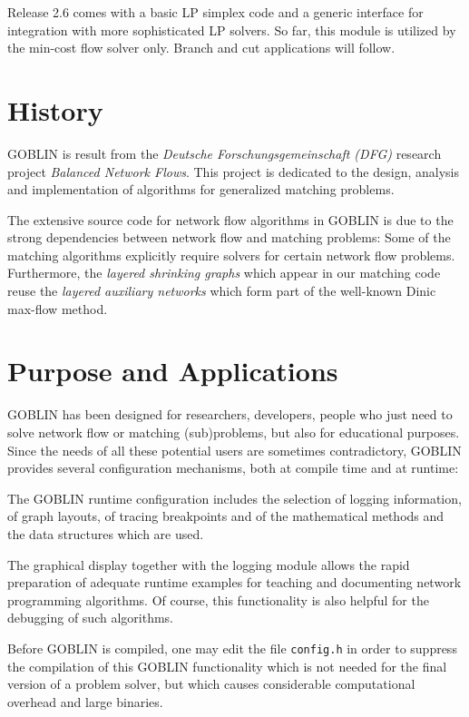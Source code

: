 \documentclass[a4paper,11pt,twoside]{book}
\begin{document}
\begin{multicols}{2}
Release 2.6 comes with a basic LP simplex code and a generic interface for
integration with more sophisticated LP solvers. So far, this module is
utilized by the min-cost flow solver only. Branch and cut applications will
follow.




\section{History}
GOBLIN is result from the {\it Deutsche Forschungsgemeinschaft (DFG)} research
project {\it Balanced Network Flows}. This project is dedicated to the design,
analysis and implementation of algorithms for generalized matching problems. 

The extensive source code for network flow algorithms in GOBLIN is due to the
strong dependencies between network flow and matching problems: Some of the
matching algorithms explicitly require solvers for certain network flow
problems. Furthermore, the {\it layered shrinking graphs} which appear in our
matching code reuse the {\it layered auxiliary networks} which form part of the
well-known Dinic max-flow method.



\section{Purpose and Applications}

GOBLIN has been designed for researchers, developers, people who just need to
solve network flow or matching (sub)problems, but also for educational
purposes. Since the needs of all these potential users are sometimes
contradictory,
GOBLIN provides several configuration mechanisms, both at compile time and at
runtime:

The GOBLIN runtime configuration includes the selection of logging information,
of graph layouts, of tracing breakpoints and of the mathematical methods and
the data structures which are used.

The graphical display together with the logging module allows the rapid
preparation of adequate runtime examples for teaching and documenting network
programming algorithms. Of course, this functionality is also helpful for the
debugging of such algorithms.

Before GOBLIN is compiled, one may edit the file \verb/config.h/ in order to
suppress the compilation of this GOBLIN functionality which is not needed for
the final version of a problem solver, but which causes considerable
computational overhead and large binaries.


\end{multicols}
\end{document}
